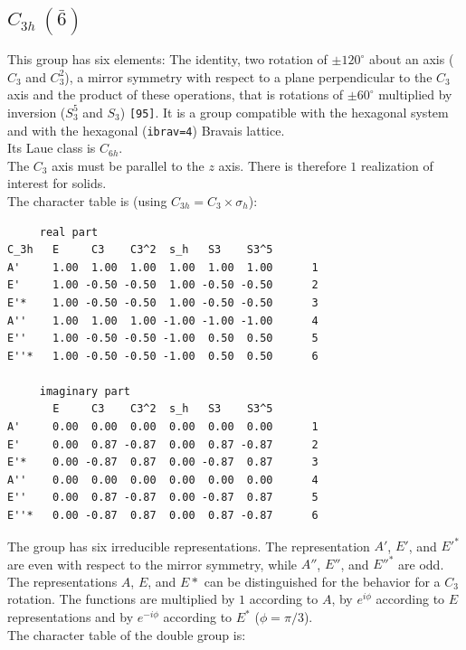 \documentclass[12pt,a4paper]{article}
\begin{document}
\subsection{\color{web-blue}$C_{3h}\ (\bar 6)$}  
This group has six elements: The identity, two rotation of $\pm120^\circ$ 
about an axis ($C_3$ and $C_3^2$), a mirror symmetry with respect to a 
plane perpendicular to the $C_3$ axis and the product of these operations, 
that is rotations of $\pm60^\circ$ multiplied by inversion 
($S_3^5$ and $S_3$) \texttt{[95]}.
It is a group compatible with the hexagonal system and with the  
hexagonal (\texttt{ibrav=4}) Bravais lattice. \\ 
Its Laue class is $C_{6h}$. \\
The $C_3$ axis must be parallel to the $z$ axis. There is therefore
$1$ realization of interest for solids. \\
The character table is (using $C_{3h}=C_3 \times \sigma_h$):
\begin{verbatim}
     real part
C_3h   E     C3    C3^2  s_h   S3    S3^5 
A'     1.00  1.00  1.00  1.00  1.00  1.00      1
E'     1.00 -0.50 -0.50  1.00 -0.50 -0.50      2
E'*    1.00 -0.50 -0.50  1.00 -0.50 -0.50      3
A''    1.00  1.00  1.00 -1.00 -1.00 -1.00      4
E''    1.00 -0.50 -0.50 -1.00  0.50  0.50      5
E''*   1.00 -0.50 -0.50 -1.00  0.50  0.50      6

     imaginary part
       E     C3    C3^2  s_h   S3    S3^5 
A'     0.00  0.00  0.00  0.00  0.00  0.00      1
E'     0.00  0.87 -0.87  0.00  0.87 -0.87      2
E'*    0.00 -0.87  0.87  0.00 -0.87  0.87      3
A''    0.00  0.00  0.00  0.00  0.00  0.00      4
E''    0.00  0.87 -0.87  0.00 -0.87  0.87      5
E''*   0.00 -0.87  0.87  0.00  0.87 -0.87      6
\end{verbatim}
The group has six irreducible representations. The representation 
$A'$, $E'$, and $E'^*$ are even with respect to the mirror symmetry, while
$A''$, $E''$, and $E''^*$ are odd. The representations $A$, $E$, and $E*$
can be distinguished for the behavior for a $C_3$ rotation. 
The functions are multiplied by $1$ according to $A$, by $e^{i\phi}$ according to 
$E$ representations and by $e^{-i\phi}$ according to $E^*$ ($\phi=\pi /3$). \\
The character table of the double group is:
\end{document}
